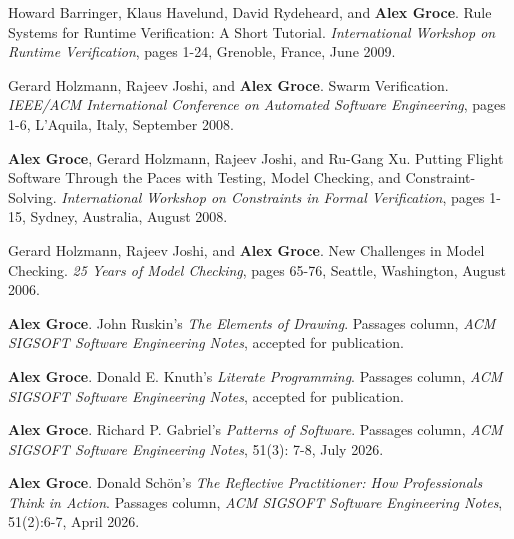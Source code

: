 \documentclass[ComputerScience]{vita}
\begin{document}
\begin{vita}
\begin{Invited Papers}
\item Howard Barringer, Klaus Havelund, David Rydeheard, and {\bf Alex Groce}.
\newblock Rule Systems for Runtime Verification: A Short Tutorial.
\newblock \emph{International Workshop on Runtime Verification}, pages 1-24, Grenoble, France, June 2009.

\item Gerard Holzmann, Rajeev Joshi, and {\bf Alex Groce}.
\newblock Swarm Verification.
\newblock \emph{IEEE/ACM International Conference on Automated Software Engineering}, pages 1-6, L'Aquila, Italy, September 2008.

\item {\bf Alex Groce}, Gerard Holzmann, Rajeev Joshi, and Ru-Gang Xu.
\newblock Putting Flight Software Through the Paces with Testing, Model Checking, and Constraint-Solving.
\newblock \emph{International Workshop on Constraints in Formal Verification}, pages 1-15, Sydney, Australia, August 2008.

\item
Gerard Holzmann, Rajeev Joshi, and {\bf Alex Groce}.
\newblock New Challenges in Model Checking.
\newblock \emph
{25 Years of Model Checking}, pages 65-76, Seattle, Washington, August 2006.
\end{Invited Papers}

\begin{Columns, Book Reviews, and Magazine Articles}

\item{\bf Alex Groce}.
  \newblock John Ruskin's \emph{The Elements of Drawing}. 
  \newblock Passages column, \emph{ACM SIGSOFT Software Engineering 
  Notes}, accepted for publication.  

\item{\bf Alex Groce}.
  \newblock Donald E. Knuth's \emph{Literate Programming}. 
  \newblock Passages column, \emph{ACM SIGSOFT Software Engineering 
  Notes}, accepted for publication.  
  
\item{\bf Alex Groce}. 
  \newblock Richard P. Gabriel's \emph{Patterns of Software}. 
  \newblock Passages column, \emph{ACM SIGSOFT Software Engineering 
  Notes}, 51(3): 7-8, July 2026.  
  
\item{\bf Alex Groce}. 
  \newblock Donald Schön's \emph{The Reflective Practitioner: How Professionals Think in Action}. 
  \newblock Passages column, \emph{ACM SIGSOFT Software Engineering 
  Notes}, 51(2):6-7, April 2026.  
  

\end{Columns, Book Reviews, and Magazine Articles}
\end{vita}
\end{document}
